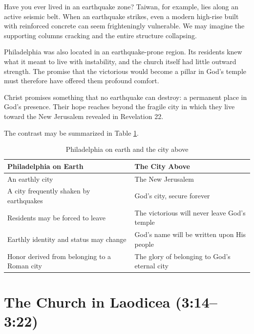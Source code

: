 Have you ever lived in an earthquake zone? Taiwan, for example, lies along an active seismic belt. When an earthquake strikes, even a modern high-rise built with reinforced concrete can seem frighteningly vulnerable. We may imagine the supporting columns cracking and the entire structure collapsing.

Philadelphia was also located in an earthquake-prone region. Its residents knew what it meant to live with instability, and the church itself had little outward strength. The promise that the victorious would become a pillar in God's temple must therefore have offered them profound comfort.

Christ promises something that no earthquake can destroy: a permanent place in God's presence. Their hope reaches beyond the fragile city in which they live toward the New Jerusalem revealed in Revelation 22.

The contrast may be summarized in Table \ref{table:philadelphia_cities}.

{
\renewcommand{\arraystretch}{1}
\begin{longtable}{>{\raggedright\arraybackslash}p{4.5cm}|>{\raggedright\arraybackslash}p{4.5cm}}
\caption{Philadelphia on earth and the city above}
\label{table:philadelphia_cities} \\
\hline
\textbf{Philadelphia on Earth} &
\textbf{The City Above}
\\
\hline
An earthly city &
The New Jerusalem
\\
A city frequently shaken by earthquakes &
God's city, secure forever
\\
Residents may be forced to leave &
The victorious will never leave God's temple
\\
Earthly identity and status may change &
God's name will be written upon His people
\\
Honor derived from belonging to a Roman city &
The glory of belonging to God's eternal city
\\
\hline
\end{longtable}
}

\section{The Church in Laodicea (3:14--3:22)}

